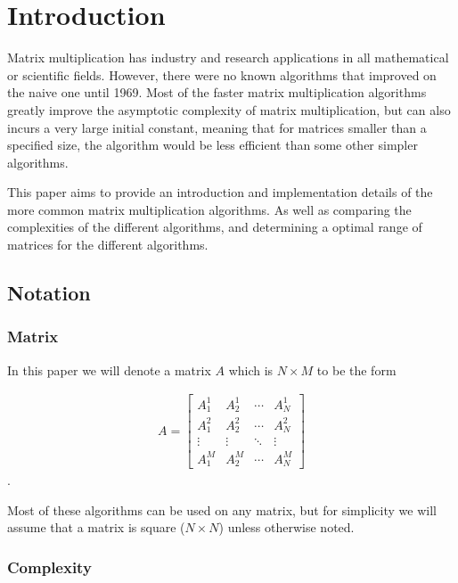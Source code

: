 \documentclass[../main.tex]{subfiles}
\begin{document}
\section{Introduction}%
\label{sec:introduction}

Matrix multiplication has industry and research applications in all
mathematical or scientific fields. However, there were no known algorithms that
improved on the naive one until 1969. Most of the faster matrix multiplication
algorithms greatly improve the asymptotic complexity of matrix multiplication,
but can also incurs a very large initial constant, meaning that for matrices
smaller than a specified size, the algorithm would be less efficient than some
other simpler algorithms.

This paper aims to provide an introduction and implementation details of the
more common matrix multiplication algorithms. As well as comparing the
complexities of the different algorithms, and determining a optimal range of
matrices for the different algorithms.

\subsection{Notation}%
\label{sub:notation}

\subsubsection{Matrix}%
\label{ssub:matrix}

In this paper we will denote a matrix $A$ which is $N\times M$ to be the form

\begin{align*}
  A = \begin{bmatrix}
    A_1^1 & A_2^1 & \cdots & A_N^1\\
    A_1^2 & A_2^2 & \cdots & A_N^2 \\
    \vdots & \vdots & \ddots & \vdots \\
    A_1^M & A_2^M & \cdots & A_N^M
  \end{bmatrix}
\end{align*}.

Most of these algorithms can be used on any matrix, but for simplicity we will
assume that a matrix is square ($N\times N$) unless otherwise noted.

\subsubsection{Complexity}%
\label{ssub:complexity}
\end{document}
